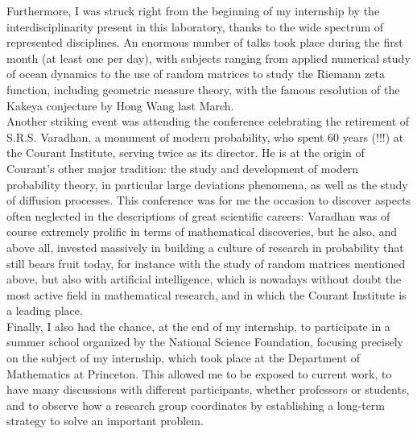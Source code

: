 \documentclass[11pt,a4paper]{article}
\begin{document}
\hspace*{2em} Furthermore, I was struck right from the beginning of my internship by the interdisciplinarity present in this laboratory, thanks to the wide spectrum of represented disciplines. An enormous number of talks took place during the first month (at least one per day), with subjects ranging from applied numerical study of ocean dynamics to the use of random matrices to study the Riemann zeta function, including geometric measure theory, with the famous resolution of the Kakeya conjecture by Hong Wang last March. \\
\hspace*{2em} Another striking event was attending the conference celebrating the retirement of S.R.S. Varadhan, a monument of modern probability, who spent 60 years (!!!) at the Courant Institute, serving twice as its director. He is at the origin of Courant’s other major tradition: the study and development of modern probability theory, in particular large deviations phenomena, as well as the study of diffusion processes. This conference was for me the occasion to discover aspects often neglected in the descriptions of great scientific careers: Varadhan was of course extremely prolific in terms of mathematical discoveries, but he also, and above all, invested massively in building a culture of research in probability that still bears fruit today, for instance with the study of random matrices mentioned above, but also with artificial intelligence, which is nowadays without doubt the most active field in mathematical research, and in which the Courant Institute is a leading place. \\
\hspace*{2em} Finally, I also had the chance, at the end of my internship, to participate in a summer school organized by the National Science Foundation, focusing precisely on the subject of my internship, which took place at the Department of Mathematics at Princeton. This allowed me to be exposed to current work, to have many discussions with different participants, whether professors or students, and to observe how a research group coordinates by establishing a long-term strategy to solve an important problem. \\
\end{document}
